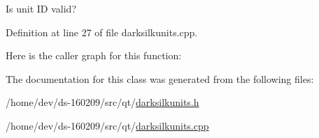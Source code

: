 Is unit I\+D valid? 



Definition at line 27 of file darksilkunits.\+cpp.



Here is the caller graph for this function\+:




The documentation for this class was generated from the following files\+:\begin{DoxyCompactItemize}
\item 
/home/dev/ds-\/160209/src/qt/\hyperlink{darksilkunits_8h}{darksilkunits.\+h}\item 
/home/dev/ds-\/160209/src/qt/\hyperlink{darksilkunits_8cpp}{darksilkunits.\+cpp}\end{DoxyCompactItemize}
